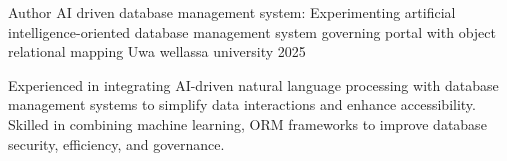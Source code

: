 

\begin{cventries}

  \cventry
    {Author} %
    {AI driven database management system: Experimenting artificial intelligence-oriented database management system governing portal with object relational mapping} %
    {Uwa wellassa university} %
    {2025} %
    {
      \begin{cvitems} %
        \item {Experienced in integrating AI-driven natural language processing with database management systems to simplify data interactions and enhance accessibility. Skilled in combining machine learning, ORM frameworks to improve database security, efficiency, and governance.}
      \end{cvitems}
    }

\end{cventries}
